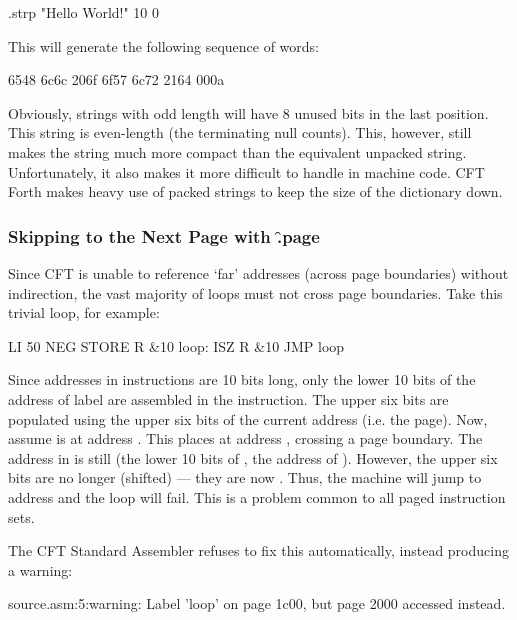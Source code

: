 \begin{cftasmcode}
.strp "Hello World!" 10 0
\end{cftasmcode}

This will generate the following sequence of words:

\begin{intrcode}
6548 6c6c 206f 6f57 6c72 2164 000a
\end{intrcode}

Obviously, strings with odd length will have 8 unused bits in the last
position. This string is even-length (the terminating null counts). This,
however, still makes the string much more compact than the equivalent unpacked
string. Unfortunately, it also makes it more difficult to handle in machine
code. CFT Forth makes heavy use of packed strings to keep the size of the
dictionary down.



\subsubsection{Skipping to the Next Page with \f{.page}}

Since CFT is unable to reference ‘far’ addresses (across page boundaries)
without indirection, the vast majority of loops must not cross page
boundaries. Take this trivial loop, for example:

\begin{cftasmcode}
        LI 50
        NEG
        STORE R &10
loop:   ISZ R &10
        JMP loop
\end{cftasmcode}

Since addresses in instructions are 10 bits long, only the lower 10 bits of the
address of label  are assembled in the  instruction. The upper
six bits are populated using the upper six bits of the current address
(i.e. the page). Now, assume  is at address . This places
 at address , crossing a page boundary. The address in
 is still  (the lower 10 bits of , the address of
). However, the upper six bits are no longer  (shifted) —
they are now . Thus, the machine will jump to address  and
the loop will fail. This is a problem common to all paged instruction sets.

The CFT Standard Assembler refuses to fix this automatically, instead producing a warning:

\begin{intrcode}
source.asm:5:warning: Label 'loop' on page 1c00,
  but page 2000 accessed instead.
\end{intrcode}

